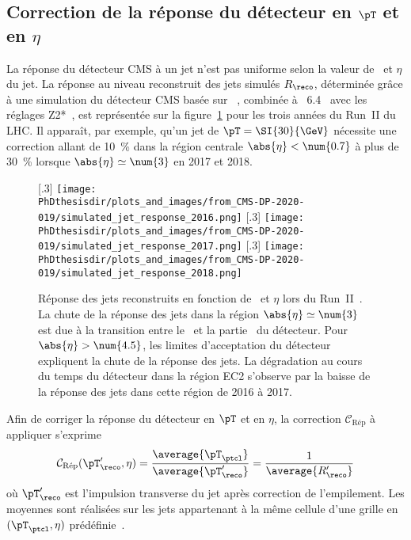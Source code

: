\subsection{Correction de la réponse du détecteur en $\pT$ et en $\eta$}\label{chapter-JERC-section-CMS-subsec-reponse}
La réponse du détecteur CMS à un jet n'est pas uniforme selon la valeur de \pT\ et $\eta$ du jet.
La réponse au niveau reconstruit des jets simulés $R_\reco$,
déterminée grâce à une simulation du détecteur CMS basée sur \GEANTfour~\cite{geant4_2003,geant4_2006,geant4_2016},
combinée à \PYTHIA~6.4~\cite{pythia6.4}
avec les réglages Z2*~\cite{tunes_2016},
est représentée sur la figure~\ref{fig-simulated_jet_response_RunII} pour les trois années du Run~II du LHC.
Il apparaît, par exemple, qu'un jet de $\pT=\SI{30}{\GeV}$ nécessite une correction allant de \SI{10}{\%} dans la région centrale $\abs{\eta}<\num{0.7}$ à plus de \SI{30}{\%} lorsque $\abs{\eta}\simeq\num{3}$ en 2017 et 2018.
\begin{figure}[h]
\centering
{}[.3\textwidth]
{\texttt{[image: \\PhDthesisdir/plots\_and\_images/from\_CMS-DP-2020-019/simulated\_jet\_response\_2016.png]}}
\hfill
{}[.3\textwidth]
{\texttt{[image: \\PhDthesisdir/plots\_and\_images/from\_CMS-DP-2020-019/simulated\_jet\_response\_2017.png]}}
\hfill
{}[.3\textwidth]
{\texttt{[image: \\PhDthesisdir/plots\_and\_images/from\_CMS-DP-2020-019/simulated\_jet\_response\_2018.png]}}
\caption[Réponse des jets reconstruits en fonction de \pT\ et $\eta$ lors du Run~II.]{Réponse des jets reconstruits en fonction de \pT\ et $\eta$ lors du Run~II~\cite{CMS-DP-2020-019}. La chute de la réponse des jets dans la région $\abs{\eta}\simeq\num{3}$ est due à la transition entre le \CMSendcap\ et la partie \CMSforward\ du détecteur. Pour $\abs{\eta}>\num{4.5}$, les limites d'acceptation du détecteur expliquent la chute de la réponse des jets. La dégradation au cours du temps du détecteur dans la région \og EC2 \fg{} s'observe par la baisse de la réponse des jets dans cette région de 2016 à 2017.}
\label{fig-simulated_jet_response_RunII}
\end{figure}
\par Afin de corriger la réponse du détecteur en $\pT$ et en $\eta$, la correction $\mathcal{C}_\text{Rép}$ à appliquer s'exprime
\begin{equation}
\mathcal{C}_\text{Rép}(\pT_\reco', \eta) = \frac{\average{\pT_\ptcl}}{\average{\pT_\reco'}} = \frac{1}{\average{R_\reco'}}
\end{equation}
où $\pT_\reco'$ est l'impulsion transverse du jet après correction de l'empilement.
Les moyennes sont réalisées sur les jets appartenant à la même cellule d'une grille en $(\pT_\ptcl, \eta)$ prédéfinie~\cite{JERC_RunI}.
